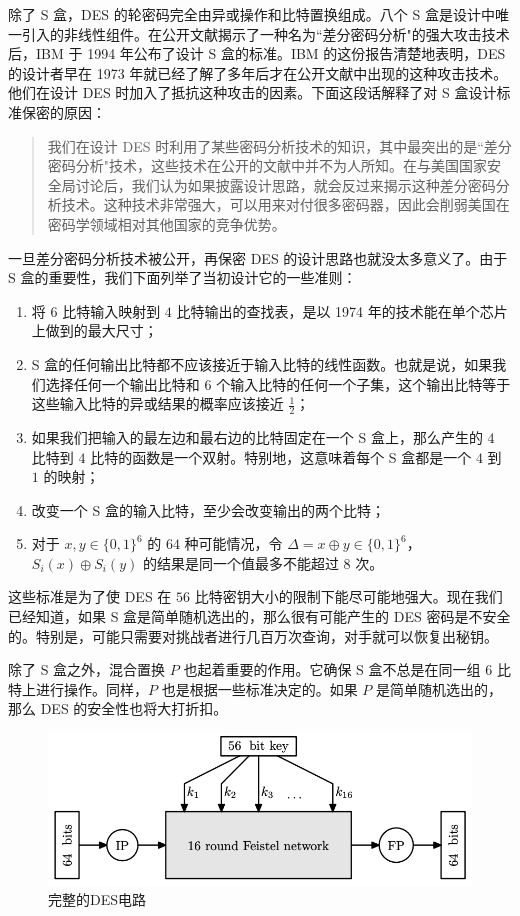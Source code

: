 \begin{snote}
\vspace*{5pt}

\noindent
除了 S 盒，DES 的轮密码完全由异或操作和比特置换组成。八个 S 盒是设计中唯一引入的非线性组件。在公开文献揭示了一种名为``差分密码分析"的强大攻击技术后，IBM 于 1994 年公布了设计 S 盒的标准。IBM 的这份报告清楚地表明，DES 的设计者早在 1973 年就已经了解了多年后才在公开文献中出现的这种攻击技术。他们在设计 DES 时加入了抵抗这种攻击的因素。下面这段话解释了对 S 盒设计标准保密的原因：
\begin{quote}
我们在设计 DES 时利用了某些密码分析技术的知识，其中最突出的是``差分密码分析"技术，这些技术在公开的文献中并不为人所知。在与美国国家安全局讨论后，我们认为如果披露设计思路，就会反过来揭示这种差分密码分析技术。这种技术非常强大，可以用来对付很多密码器，因此会削弱美国在密码学领域相对其他国家的竞争优势。
\end{quote}
一旦差分密码分析技术被公开，再保密 DES 的设计思路也就没太多意义了。由于 S 盒的重要性，我们下面列举了当初设计它的一些准则：
\begin{enumerate}
	\item 将 $6$ 比特输入映射到 $4$ 比特输出的查找表，是以 1974 年的技术能在单个芯片上做到的最大尺寸；
	\item S 盒的任何输出比特都不应该接近于输入比特的线性函数。也就是说，如果我们选择任何一个输出比特和 $6$ 个输入比特的任何一个子集，这个输出比特等于这些输入比特的异或结果的概率应该接近 $\frac{1}{2}$；
	\item 如果我们把输入的最左边和最右边的比特固定在一个 S 盒上，那么产生的 $4$ 比特到 $4$ 比特的函数是一个双射。特别地，这意味着每个 S 盒都是一个 $4$ 到 $1$ 的映射；
	\item 改变一个 S 盒的输入比特，至少会改变输出的两个比特；
	\item 对于 $x,y\in\{0,1\}^6$ 的 $64$ 种可能情况，令 $\Delta=x\oplus y\in\{0,1\}^6$，$S_i(x)\oplus S_i(y)$ 的结果是同一个值最多不能超过 $8$ 次。
\end{enumerate}
这些标准是为了使 DES 在 $56$ 比特密钥大小的限制下能尽可能地强大。现在我们已经知道，如果 S 盒是简单随机选出的，那么很有可能产生的 DES 密码是不安全的。特别是，可能只需要对挑战者进行几百万次查询，对手就可以恢复出秘钥。

除了 S 盒之外，混合置换 $P$ 也起着重要的作用。它确保 S 盒不总是在同一组 $6$ 比特上进行操作。同样，$P$ 也是根据一些标准决定的。如果 $P$ 是简单随机选出的，那么 DES 的安全性也将大打折扣。
\end{snote}

\begin{figure}
  \centering
  \includegraphics[width=0.6\linewidth]{figures/chapter4/fig9.png}
  \caption{完整的DES电路}
  \label{fig:4-9}
\end{figure}

